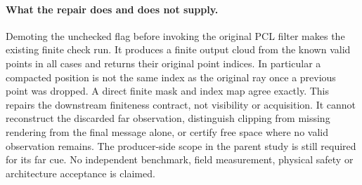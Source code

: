\documentclass{article}
\begin{document}
\paragraph{What the repair does and does not supply.}
Demoting the unchecked flag before invoking the original PCL
filter makes the existing finite check run. It produces a
finite output cloud from the known valid points in all cases
and returns their original point indices. In particular a
compacted position is not the same index as the original ray
once a previous point was dropped. A direct finite mask and
index map agree exactly. This repairs the downstream
finiteness contract, not visibility or acquisition. It cannot
reconstruct the discarded far observation, distinguish clipping
from missing rendering from the final message alone, or certify
free space where no valid observation remains. The producer-side
scope in the parent study is still required for its far cue.
No independent benchmark, field measurement, physical safety or
architecture acceptance is claimed.
\end{document}
